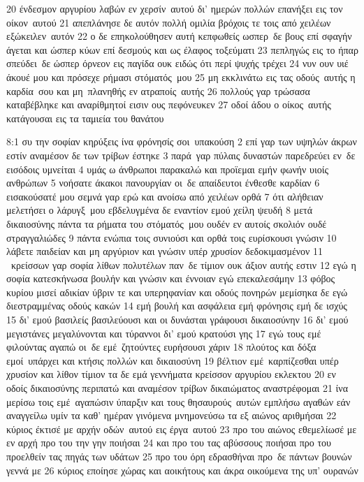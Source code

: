 \documentclass[10pt,oneside,footinclude=true,headinclude=true]{scrbook} %
\begin{document}
20 ένδεσμον αργυρίου λαβών εν χερσίν αυτού δι' ημερών πολλών επανήξει εις τον οίκον αυτού
21 απεπλάνησε δε αυτόν πολλή ομιλία βρόχοις τε τοις από χειλέων εξώκειλεν αυτόν
22 ο δε επηκολούθησεν αυτή κεπφωθείς ωσπερ δε βους επί σφαγήν άγεται και ώσπερ κύων επί δεσμούς και ως έλαφος τοξεύματι
23 πεπληγώς εις το ήπαρ σπεύδει δε ώσπερ όρνεον εις παγίδα ουκ ειδώς ότι περί ψυχής τρέχει
24 νυν ουν υιέ άκουέ μου και πρόσεχε ρήμασι στόματός μου
25 μη εκκλινάτω εις τας οδούς αυτής η καρδία σου και μη πλανηθής εν ατραποίς αυτής
26 πολλούς γαρ τρώσασα καταβέβληκε και αναρίθμητοί εισιν ους πεφόνευκεν
27 οδοί άδου ο οίκος αυτής κατάγουσαι εις τα ταμιεία του θανάτου
\par
8:1 συ την σοφίαν κηρύξεις ίνα φρόνησίς σοι υπακούση
2 επί γαρ των υψηλών άκρων εστίν αναμέσον δε των τρίβων έστηκε
3 παρά γαρ πύλαις δυναστών παρεδρεύει εν δε εισόδοις υμνείται
4 υμάς ω άνθρωποι παρακαλώ και προϊεμαι εμήν φωνήν υιοίς ανθρώπων
5 νοήσατε άκακοι πανουργίαν οι δε απαίδευτοι ένθεσθε καρδίαν
6 εισακούσατέ μου σεμνά γαρ ερώ και ανοίσω από χειλέων ορθά
7 ότι αλήθειαν μελετήσει ο λάρυγξ μου εβδελυγμένα δε εναντίον εμού χείλη ψευδή
8 μετά δικαιοσύνης πάντα τα ρήματα του στόματός μου ουδέν εν αυτοίς σκολιόν ουδέ στραγγαλιώδες
9 πάντα ενώπια τοις συνιούσι και ορθά τοις ευρίσκουσι γνώσιν
10 λάβετε παιδείαν και μη αργύριον και γνώσιν υπέρ χρυσίον δεδοκιμασμένον
11  κρείσσων γαρ σοφία λίθων πολυτέλων παν δε τίμιον ουκ άξιον αυτής εστιν
12 εγώ η σοφία κατεσκήνωσα βουλήν και γνώσιν και έννοιαν εγώ επεκαλεσάμην
13 φόβος κυρίου μισεί αδικίαν ύβριν τε και υπερηφανίαν και οδούς πονηρών μεμίσηκα δε εγώ διεστραμμένας οδούς κακών
14 εμή βουλή και ασφάλεια εμή φρόνησις εμή δε ισχύς
15 δι' εμού βασιλείς βασιλεύουσι και οι δυνάσται γράφουσι δικαιοσύνην
16 δι' εμού μεγιστάνες μεγαλύνονται και τύραννοι δι' εμού κρατούσι γης
17 εγώ τους εμέ φιλούντας αγαπώ οι δε εμέ ζητούντες ευρήσουσι χάριν
18 πλούτος και δόξα εμοί υπάρχει και κτήσις πολλών και δικαιοσύνη
19 βέλτιον εμέ καρπίζεσθαι υπέρ χρυσίον και λίθον τίμιον τα δε εμά γεννήματα κρείσσον αργυρίου εκλεκτου
20 εν οδοίς δικαιοσύνης περιπατώ και αναμέσον τρίβων δικαιώματος αναστρέφομαι
21 ίνα μερίσω τοις εμέ αγαπώσιν ύπαρξιν και τους θησαυρούς αυτών εμπλήσω αγαθών εάν αναγγείλω υμίν τα καθ' ημέραν γινόμενα μνημονεύσω τα εξ αιώνος αριθμήσαι
22 κύριος έκτισέ με αρχήν οδών αυτού εις έργα αυτού
23 προ του αιώνος εθεμελίωσέ με εν αρχή προ του την γην ποιήσαι
24 και προ του τας αβύσσους ποιήσαι προ του προελθείν τας πηγάς των υδάτων
25 προ του όρη εδρασθήναι προ δε πάντων βουνών γεννά με
26 κύριος εποίησε χώρας και αοικήτους και άκρα οικούμενα της υπ' ουρανών
\end{document}
